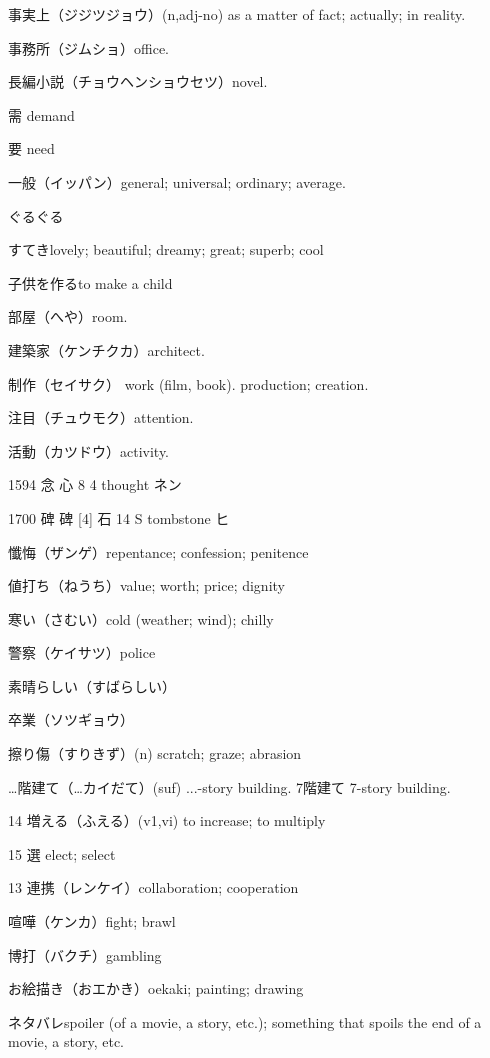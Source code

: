 事実上（ジジツジョウ）(n,adj-no)
as a matter of fact; actually; in reality.

事務所（ジムショ）office.

長編小説（チョウヘンショウセツ）novel.

需 demand

要 need

一般（イッパン）general; universal; ordinary; average.

ぐるぐる

すてきlovely; beautiful; dreamy; great; superb; cool


子供を作るto make a child

部屋（へや）room.

建築家（ケンチクカ）architect.

制作（セイサク）
work (film, book).
production; creation.

注目（チュウモク）attention.

活動（カツドウ）activity.

1594	念		心	8	4		thought	ネン

1700	碑	碑 [4]	石	14	S		tombstone	ヒ

懺悔（ザンゲ）repentance; confession; penitence

値打ち（ねうち）value; worth; price; dignity

寒い（さむい）cold (weather; wind); chilly

警察（ケイサツ）police

素晴らしい（すばらしい）

卒業（ソツギョウ）

擦り傷（すりきず）(n) scratch; graze; abrasion

…階建て（…カイだて）(suf) ...-story building.
7階建て 7-story building.

14 増える（ふえる）(v1,vi) to increase; to multiply

15 選 elect; select

13 連携（レンケイ）collaboration; cooperation

喧嘩（ケンカ）fight; brawl

博打（バクチ）gambling

お絵描き（おエかき）oekaki; painting; drawing

ネタバレspoiler (of a movie, a story, etc.); something that spoils the end of a movie, a story, etc.
